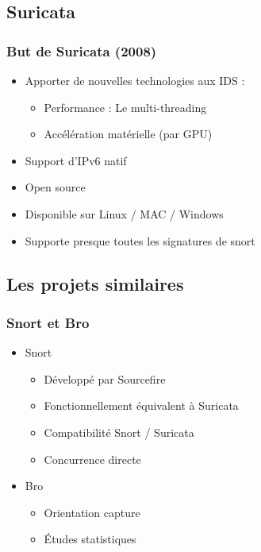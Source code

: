 \documentclass{beamer}
\begin{document}
\subsection{Suricata}
\begin{frame}
\frametitle{But de Suricata (2008)}
\begin{itemize}
[triangle]
\item Apporter de nouvelles technologies aux IDS :
\begin{itemize}
\item Performance : Le multi-threading
\item Accélération matérielle (par GPU)
\end{itemize}
\item Support d'IPv6 natif
\item Open source
\item Disponible sur Linux / MAC / Windows
\item Supporte presque toutes les signatures de snort
\end{itemize}
\end{frame}

\subsection{Les projets similaires}
\begin{frame}
\frametitle{Snort et Bro}
\begin{itemize}
[triangle]
\item Snort
\begin{itemize}
\item Développé par Sourcefire
\item Fonctionnellement équivalent à Suricata
\item Compatibilité Snort / Suricata
\item Concurrence directe
\end{itemize}
\pause
\item Bro
\begin{itemize}
\item Orientation capture
\item Études statistiques
\end{itemize}
\end{itemize}
\end{frame}

\end{document}
